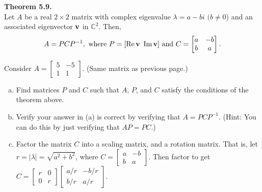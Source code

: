 \newpage

\begin{boxthm}
	\textbf{Theorem 5.9.} \\
	Let $A$ be a real $2 \times 2$ matrix with complex eigenvalue $\lambda = a-bi$ $(b \ne 0$) and an associated eigenvector $\boldsymbol{\mathbf{v}}$ in $\mathbb{C}^2$. Then, $$A = PCP^{-1}, \text{ where } P = [ \operatorname{Re} \boldsymbol{\mathbf{v}} \text{ } \operatorname{Im} \boldsymbol{\mathbf{v}} ] \text{ and } C = \begin{bmatrix}a&-b\\b&a \end{bmatrix}.$$
\end{boxthm}

\begin{exercise} 
	Consider $A  = \begin{bmatrix}5&-5\\1&1 \end{bmatrix}.$ (Same matrix as previous page.)
	\begin{enumerate}[(a)]
		\item Find matrices $P$ and $C$ such that $A$, $P$, and $C$ satisfy the conditions of the theorem above.
		\vfill
		\item Verify your answer in (a) is correct by verifying that $A = PCP^{-1}$. (Hint: You can do this by just verifying that $AP=PC$.)
		\vfill
		\item Factor the matrix $C$ into a scaling matrix, and a rotation matrix. That is, let $r = |\lambda| = \sqrt{a^2+b^2}$, where $ C = \begin{bmatrix}a&-b\\b&a \end{bmatrix}.$ Then factor to get $C = \begin{bmatrix}r&0\\0&r \end{bmatrix}\begin{bmatrix}a/r&-b/r\\b/r&a/r \end{bmatrix}.$
		\vfill
	\end{enumerate}
\end{exercise}

\newpage
